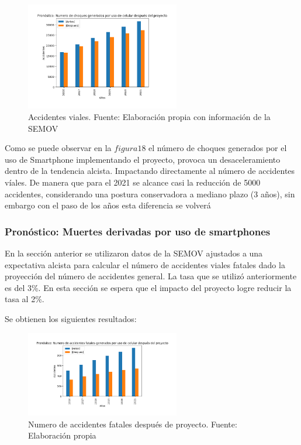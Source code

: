 \documentclass{article}
\begin{document}
	\begin{figure}[H]\centering
	\includegraphics[width=0.6\textwidth]{resources/img/smart_accidents_after.png}
	\caption{\label{fig:smart_accidents_after} Accidentes viales. Fuente: Elaboración propia con información de la SEMOV}
    \end{figure}
Como se puede observar en la $figura 18$ el número de choques generados por el uso de Smartphone implementando el proyecto, provoca un desaceleramiento dentro de la tendencia alcista. Impactando directamente al número de accidentes víales. De manera que para el 2021 se alcance casi la reducción de 5000 accidentes, considerando una postura conservadora a mediano plazo (3 años), sin embargo con el paso de los años esta diferencia se volverá 

\subsubsection{Pronóstico: Muertes derivadas por uso de smartphones}

En la sección anterior se utilizaron datos de la SEMOV ajustados a una expectativa alcista para calcular el número 
de accidentes viales fatales dado la proyección del número de accidentes general. La tasa que se utilizó anteriormente 
es del 3\%. En esta sección se espera que el impacto del proyecto logre reducir la tasa al 2\%.

Se obtienen los siguientes resultados:

	\begin{figure}[H]\centering
	\includegraphics[width=0.6\textwidth]{resources/img/smart_fatal_accidents_after.png}
	\caption{\label{fig:prono_accidentes_fatales_after} Numero de accidentes fatales después de proyecto. Fuente: Elaboración propia}
    \end{figure}
\end{document}
